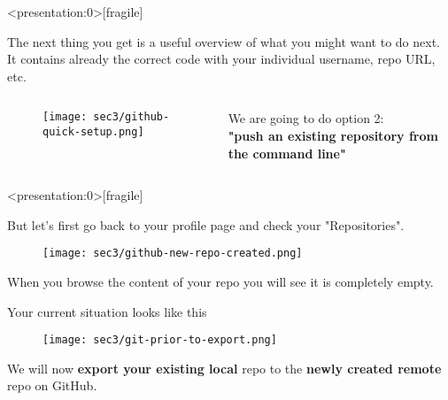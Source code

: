\begin{frame}<presentation:0>[fragile]
\emptyframetitle

  The next thing you get is a useful overview of what you might want to do next. It contains already the correct code with your individual username, repo URL, etc.

  \begin{columns}
  \begin{column}{0.6\textwidth}
    \begin{figure}[h]
      \texttt{[image: sec3/github-quick-setup.png]}
    \end{figure}
  \end{column}
  \begin{column}{0.4\textwidth}
    \vspace*{3.25cm}
    We are going to do option 2:\\ \textbf{"push an existing repository from the command line"}
  \end{column}
  \end{columns}

\end{frame}


\begin{frame}<presentation:0>[fragile]
\emptyframetitle

  But let's first go back to your profile page and check your "Repositories".\\[0.25cm]

  \begin{figure}[h]
    \texttt{[image: sec3/github-new-repo-created.png]}
  \end{figure}

  When you browse the content of your repo you will see it is completely empty.

\end{frame}


\begin{frame}[fragile]
\emptyframetitle

  Your current situation looks like this

  \begin{figure}[h]
    \texttt{[image: sec3/git-prior-to-export.png]}
  \end{figure}

  We will now \textbf{export your existing local} repo to the \textbf{newly created remote} repo on GitHub.

\end{frame}


